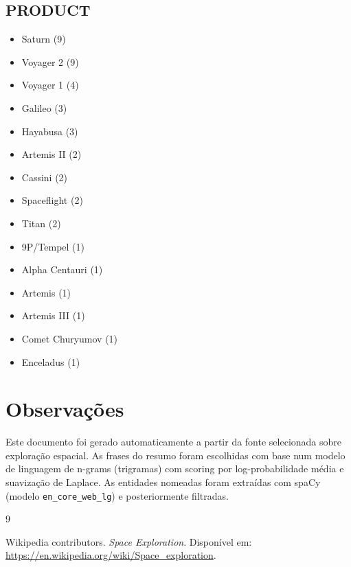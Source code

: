 \documentclass[12pt]{article}
\begin{document}
\subsection*{PRODUCT}
\begin{itemize}
\item Saturn (9)
\item Voyager 2 (9)
\item Voyager 1 (4)
\item Galileo (3)
\item Hayabusa (3)
\item Artemis II (2)
\item Cassini (2)
\item Spaceflight (2)
\item Titan (2)
\item 9P/Tempel (1)
\item Alpha Centauri (1)
\item Artemis (1)
\item Artemis III (1)
\item Comet Churyumov (1)
\item Enceladus (1)
\end{itemize}


\section{Observações}

Este documento foi gerado automaticamente a partir da fonte selecionada sobre exploração espacial.
As frases do resumo foram escolhidas com base num modelo de linguagem de n-grams (trigramas) com scoring por log-probabilidade média e suavização de Laplace.
As entidades nomeadas foram extraídas com spaCy (modelo \texttt{en\_core\_web\_lg}) e posteriormente filtradas.

\begin{thebibliography}{9}

Wikipedia contributors. \textit{Space Exploration}. Disponível em: \url{https://en.wikipedia.org/wiki/Space_exploration}.

\end{thebibliography}
\end{document}
